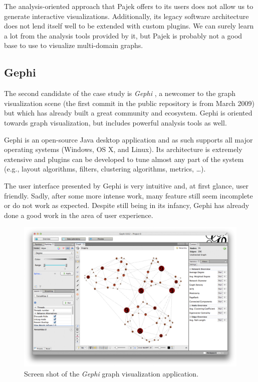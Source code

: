 The analysis-oriented approach that Pajek offers to its users does not allow us to generate interactive visualizations. Additionally, its legacy software architecture does not lend itself well to be extended with custom plugins. We can surely learn a lot from the analysis tools provided by it, but Pajek is probably not a good base to use to visualize multi-domain graphs.

\subsection{Gephi}

The second candidate of the case study is \emph{Gephi} \cite{gephi}, a newcomer to the graph visualization scene (the first commit in the public repository is from March 2009) but which has already built a great community and ecosystem. Gephi is oriented towards graph visualization, but includes powerful analysis tools as well.

Gephi is an open-source Java desktop application and as such supports all major operating systems (Windows, OS X, and Linux). Its architecture is extremely extensive and plugins can be developed to tune almost any part of the system (e.g., layout algorithms, filters, clustering algorithms, metrics, \ldots).

The user interface presented by Gephi is very intuitive and, at first glance, user friendly. Sadly, after some more intense work, many feature still seem incomplete or do not work as expected. Despite still being in its infancy, Gephi has already done a good work in the area of user experience.

\begin{figure}
  \centering
  \includegraphics[width=.8\linewidth]{images/gephi}
  \caption[Screen shot of Gephi.]{Screen shot of the \emph{Gephi} graph visualization application.}
  \label{fig:gephi}
\end{figure}

